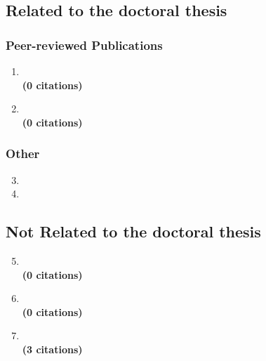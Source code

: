 \documentclass[12pt, a4paper]{book}
\begin{document}
\ListOfPublications{}

\subsection*{Related to the doctoral thesis}
\subsubsection*{Peer-reviewed Publications}

\begin{enumerate}
  \item {} \\
  \textbf{(0 citations)}
  \item {} \\
  \textbf{(0 citations)}
\end{enumerate}

\subsubsection*{Other}
\begin{enumerate}
  \setcounter{enumi}{2}
  \item {}
  \item {}
\end{enumerate}

\subsection*{Not Related to the doctoral thesis}

\begin{enumerate}
  \setcounter{enumi}{4}
  \item {} \\
  \textbf{(0 citations)}
  \item {} \\
  \textbf{(0 citations)}
  \item {} \\
  \textbf{(3 citations)}
\end{enumerate}
\end{document}
